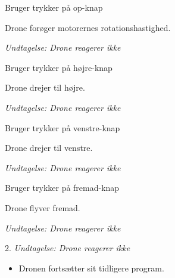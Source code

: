 \documentclass[Main]{subfiles}
\begin{document}
\begin{UseCase}
	\begin{normFor}
	\item Bruger trykker på op-knap
	\item Drone forøger motorernes rotationshastighed.
	\item[] \textit{Undtagelse: Drone reagerer ikke}
	\end{normFor} 
	
	\begin{normFor}
	\item Bruger trykker på højre-knap
	\item Drone drejer til højre.
	\item[] \textit{Undtagelse: Drone reagerer ikke}
	\end{normFor} 
	
	\begin{normFor}
	\item Bruger trykker på venstre-knap
	\item Drone drejer til venstre.
	\item[] \textit{Undtagelse: Drone reagerer ikke}
	\end{normFor} 
	
	\begin{normFor}
	\item Bruger trykker på fremad-knap
	\item Drone flyver fremad.
	\item[] \textit{Undtagelse: Drone reagerer ikke}
	\end{normFor} 

	\begin{normFor}
	\item[2.] \textit{Undtagelse: Drone reagerer ikke}
		\begin{itemize}
		\item Dronen fortsætter sit tidligere program.
		\end{itemize}
	\end{normFor} 
	
\end{UseCase}



\newpage
\end{document}
